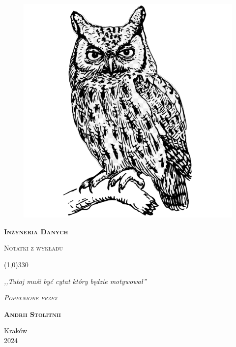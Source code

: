 \begin{titlepage} 

    \begin{center}
         \begin{figure}[h]
            \centering
            \includegraphics[scale=0.35]{images/owl.png}
        \end{figure}
        \vspace{0.5cm}
        \Huge
        \textbf{\textsc{Inżyneria Danych}}
        
        \vspace{0.5cm}
        \Large
        \textsc{Notatki z wykładu}
        
        \normalsize
        
        
        \line(1,0){330}
        
        \vspace{1cm}
        \textit{,,Tutaj muśi być cytat który będzie motywował''}\\
        \vspace{1cm}

        \textit{\textsc{Popełnione przez}}\\
        \vspace{5mm}
  
        \textbf{\textsc{Andrii Stolitnii}}
 
        \vfill

        Kraków \\
        2024
        
    \end{center}
    
\end{titlepage}